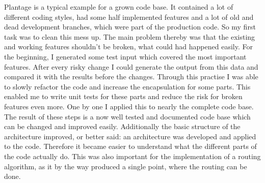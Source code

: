 Plantage is a typical example for a grown code base. It contained a lot of different coding styles, had some half implemented features and a lot of old and dead development branches, which were part of the production code. So my first task was to clean this mess up. The main problem thereby was that the existing and working features shouldn't be broken, what could had happened easily. For the beginning, I generated some test input which covered the most important features. After every risky change I could generate the output from this data and compared it with the results before the changes. Through this practise I was able to slowly refactor the code and increase the encapsulation for some parts. This enabled me to write unit tests for these parts and reduce the risk for broken features even more. One by one I applied this to nearly the complete code base. The result of these steps is a now well tested and documented code base which can be changed and improved easily. Additionally the basic structure of the architecture improved, or better said: an architecture was developed and applied to the code. Therefore it became easier to understand what the different parts of the code actually do. This was also important for the implementation of a routing algorithm, as it by the way produced a single point, where the routing can be done.